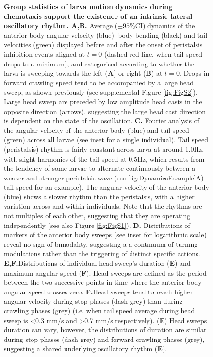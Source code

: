 \documentclass[11pt,a4paper]{article}
\begin{document}
\begin{figure}[ht!]
\begin{center}
\caption{{\bf Group statistics of larva motion dynamics during chemotaxis support the existence of an intrinsic lateral oscillatory rhythm.}
{\bf A,B.} Average ($\pm 95\%$CI) dynamics of the anterior body angular velocity (blue), body bending (black) and tail velocities (green) displayed before and after the onset of peristalsis inhibition events aligned at $t=0$ (dashed red line, when tail speed drops to a minimum), and categorised according to whether the larva is sweeping towards the left ({\bf A}) or right ({\bf B}) at $t=0$. Drops in forward crawling speed tend to be accompanied by a large head sweep, as shown previously \citep{hernandez2015reverse} (see supplemental Figure \ref{fig:FigS2}). Large head sweep are preceded by low amplitude head casts in the opposite direction (arrows), suggesting the large head cast direction is dependent on the state of the oscillation. %
{\bf C.} Fourier analysis of the angular velocity of the anterior body (blue) and tail speed (green) across all larvae (see inset for a single individual). Tail speed (peristalsis) rhythm is fairly constant across larva at around 1.0Hz, with slight harmonics of the tail speed at 0.5Hz, which results from the tendency of some larvae to alternate continuously between a weaker and stronger peristalsis wave (see \ref{fig:DynamicsExample}A) tail speed for an example). The angular velocity of the anterior body (blue) shows a slower rhythm than the peristalsis, with a higher variation across and within individuals. Note that the rhythms are not multiples of each other, suggesting that they are operating independently (see also Figure \ref{fig:FigS1}).
 {\bf D.} Distributions of markers of the anterior body sweeps (see inset for logarithmic scale) reveal no sign of bimodality, suggesting a a continuum of turning modulations rather than the triggering of distinct specific actions. {\bf E,F.}Distributions of individual head-sweep’s duration ({\bf E}) and maximum angular speed ({\bf F}). Head sweeps are defined as the period between the two successive points in time where the anterior body angular speed crosses zero. {\bf F.}Head sweeps tend to reach higher angular velocity during stop phases (dash grey) than during crawling phases (grey) (i.e. when tail speed average during head sweep is <0.3 mm/s and >0.7 mm/s respectively). ({\bf E}) Head sweeps duration can vary, however, the distributions of duration are similar during stop phases (dash grey) and forward crawling phases (grey), suggesting a shared underlying oscillatory rhythm ({\bf E}). 
\label{fig:GroupAnalysis}
}
\end{center}
\end{figure}
\end{document}
